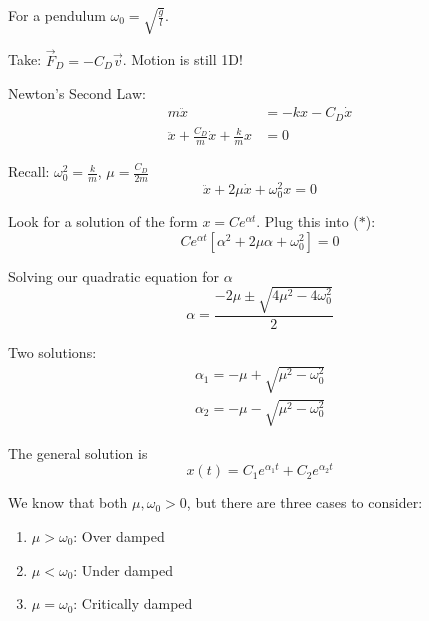 \documentclass[10pt]{scrartcl}
\begin{document}
For a pendulum $\omega_0 = \sqrt{\frac{g}{l}}$. 



\begin{center}
\end{center}

Take: $\vec{F}_D = -C_D\vec{v}$. Motion is still 1D! 

Newton's Second Law:
\[
\begin{aligned}
  m\ddot{x} &= -kx -C_D\dot{x}\\
  \ddot{x} + \frac{C_D}{m}\dot{x} + \frac{k}{m}x &= 0
\end{aligned}
\]

Recall: $\omega_0^2 = \frac{k}{m}$, $\mu= \frac{C_D}{2m}$
\[\ddot{x} + 2\mu\dot{x} + \omega_0^2x = 0 \tag{$*$}\]

Look for a solution of the form $x = Ce^{\alpha t}$. Plug this into ($*$):
\[Ce^{\alpha t}[\alpha^2 + 2\mu\alpha + \omega_0^2] = 0\]

Solving our quadratic equation for $\alpha$
\[\alpha = \frac{-2\mu \pm \sqrt{4\mu^2 -4\omega_0^2}}{2}\]

Two solutions:
\[
\begin{aligned}
  \alpha_1 = -\mu + \sqrt{\mu^2 -\omega_0^2}\\
  \alpha_2 = -\mu -\sqrt{\mu^2 -\omega_0^2}
\end{aligned}
\]

The general solution is
\[x(t) = C_1e^{\alpha_1t} + C_2e^{\alpha_2t}\]

We know that both $\mu, \omega_0 >0$, but there are three cases to consider:

\begin{enumerate}
  \item $\mu > \omega_0$: Over damped
  \item $\mu < \omega_0$: Under damped
  \item $\mu = \omega_0$: Critically damped
\end{enumerate}~
\end{document}
